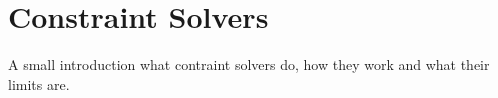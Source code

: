 \section{Constraint Solvers}
A small introduction what contraint solvers do, how they work and what their limits are.

